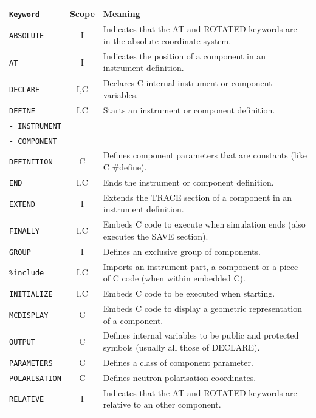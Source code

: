 \begin{table}
  \begin{center} 
    {\let\my=\\
    \begin{tabular}{|l|c|p{}|}
      \hline
      \texttt{Keyword} & Scope & Meaning \\
      \hline
      \texttt{ABSOLUTE} & I & Indicates that the AT and ROTATED keywords are in the absolute coordinate system. \\
      \texttt{AT} & I & Indicates the position of a component in an instrument definition. \\
      \texttt{DECLARE} & I,C & Declares C internal instrument or component variables. \\
      \texttt{DEFINE} & I,C & Starts an instrument or component definition. \\
      \texttt{- INSTRUMENT} & & \\
      \texttt{- COMPONENT} & & \\
      \texttt{DEFINITION} & C & Defines component parameters that are constants (like C \#define). \\
      \texttt{END} & I,C & Ends the instrument or component definition. \\
      \texttt{EXTEND} & I & Extends the TRACE section of a component in an instrument definition. \\
      \texttt{FINALLY} & I,C & Embeds C code to execute when simulation ends (also executes the SAVE section). \\
      \texttt{GROUP} & I & Defines an exclusive group of components. \\
      \texttt{\%include} & I,C & Imports an instrument part, a component or a piece of C code (when within embedded C). \\
      \texttt{INITIALIZE} & I,C & Embeds C code to be executed when starting. \\
      \texttt{MCDISPLAY} & C & Embeds C code to display a geometric  representation of a component. \\
      \texttt{OUTPUT} & C & Defines internal variables to be public and protected symbols (usually all those of DECLARE).\\
      \texttt{PARAMETERS} & C & Defines a class of component parameter. \\
      \texttt{POLARISATION} & C & Defines neutron polarisation coordinates. \\
      \texttt{RELATIVE} & I & Indicates that the AT and ROTATED keywords are relative to an other component. \\

\end{tabular}}
\end{center}
\end{table}
